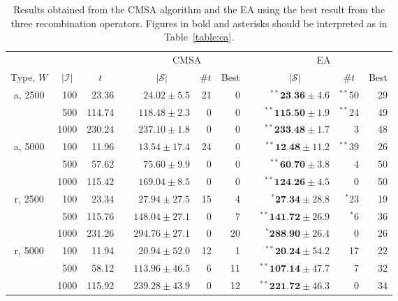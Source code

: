 \documentclass[authoryear]{elsarticle}
\begin{document}
\begin{table}[h!]
\centering
\caption{Results obtained from the CMSA algorithm and the EA using the best result from the three recombination operators. Figures in bold and asterisks should be interpreted as in Table~\ref{table:ea}.}
\footnotesize
\begin{threeparttable}
\begin{tabular}{crrcrrrcrrr}
	\toprule
	& & & & \multicolumn{3}{c}{CMSA} &\phantom{ab}& \multicolumn{3}{c}{EA}\\
	\cmidrule{5-7} \cmidrule{9-11}
	\multicolumn{1}{c}{Type, $W$} & \multicolumn{1}{c}{$|\mathcal{I}|$} & \multicolumn{1}{c}{$t$\tnote{$a$}} && \multicolumn{1}{c}{$|\mathcal{S}|$\tnote{$b$}} & \multicolumn{1}{c}{$\# t$\tnote{$c$}} & \multicolumn{1}{c}{Best\tnote{$d$}} && \multicolumn{1}{c}{$|\mathcal{S}|$} & \multicolumn{1}{c}{$\# t$} & \multicolumn{1}{c}{Best}\\
	\midrule
	a, 2500 & 100 & 23.36 && $24.02 \pm 5.5$ & 21 & 0 && $^{**}\textbf{23.36} \pm 4.6$ & $^{**}$50 & 29 \\
	& 500 & 114.74 && $118.48 \pm 2.3$ & 0 & 0 && $^{**}\textbf{115.50} \pm 1.9$ & $^{**}$24 & 49 \\
	& 1000 & 230.24 && $237.10 \pm 1.8$ & 0 & 0 && $^{**}\textbf{233.48} \pm 1.7$ & 3 & 48 \\
	\midrule
	a, 5000 & 100 & 11.96 && $13.54 \pm 17.4$ & 24 & 0 && $^{**}\textbf{12.48} \pm 11.2$ & $^{**}$39 & 26 \\
	& 500 & 57.62 && $75.60 \pm 9.9$ & 0 & 0 && $^{**}\textbf{60.70} \pm 3.8$ & 4 & 50 \\
	& 1000 & 115.42 && $169.04 \pm 8.5$ & 0 & 0 && $^{**}\textbf{124.26} \pm 4.5$ & 0 & 50 \\
	\midrule
	\midrule
	r, 2500 & 100 & 23.34 && $27.94 \pm 27.5$ & 15 & 4 && $^{*}\textbf{27.34} \pm 28.8$ & $^{*}$23 & 19 \\
	& 500 & 115.76 && $148.04 \pm 27.1$ & 0 & 7 && $^{**}\textbf{141.72} \pm 26.9$ & $^{*}$6 & 36 \\
	& 1000 & 231.26 && $294.76 \pm 27.1$ & 0 & 20 && $^{*}\textbf{288.90} \pm 26.4$ & 0 & 26 \\
	\midrule
	r, 5000 & 100 & 11.94 && $20.94 \pm 52.0$ & 12 & 1 && $^{**}\textbf{20.24} \pm 54.2$ & 17 & 22 \\
	& 500 & 58.12 && $113.96 \pm 46.5$ & 6 & 11 && $^{**}\textbf{107.14} \pm 47.7$ & 7 & 32 \\
	& 1000 & 115.92 && $239.28 \pm 43.9$ & 0 & 12 && $^{**}\textbf{221.72} \pm 46.3$ & 0 & 34 \\

\end{tabular}
\end{threeparttable}
\end{table}
\end{document}
